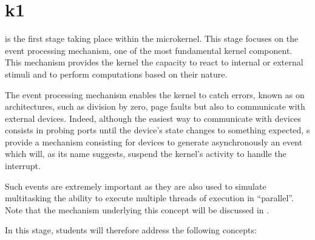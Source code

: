 %
%
%
%
%
%

%
%

\chapter{k1}
\label{chapter:k1}

 is the first stage taking place within the 
microkernel. This stage focuses on the event processing mechanism, one of
the most fundamental kernel component. This mechanism provides the kernel
the capacity to react to internal or external stimuli and to perform
computations based on their nature.

The event processing mechanism enables the kernel to catch errors, known
as  on  architectures, such as division by
zero, page faults \etc{} but also to communicate with external devices.
Indeed, although the easiest way to communicate with devices consists in
probing  ports until the device's state changes to something
expected, s provide a mechanism consisting for devices
to generate asynchronously an event which will, as its name suggests, suspend
the kernel's activity to handle the interrupt.

Such events are extremely important as they are also used to simulate
multitasking \ie{} the ability to execute multiple threads of execution
in ``parallel''. Note that the mechanism underlying this concept will be
discussed in .

In this stage, students will therefore address the following concepts:

